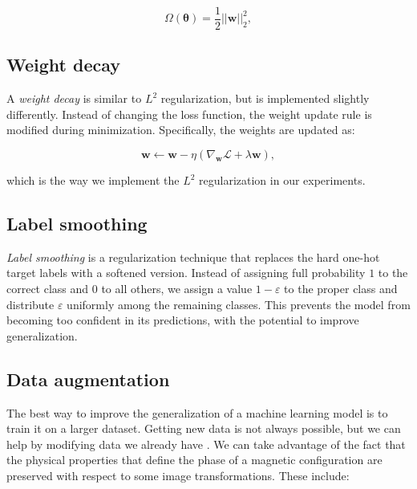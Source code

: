 \begin{equation}
 	\label{eq:l2-regularization}
 	\Omega(\bm{\theta}) = \dfrac{1}{2} ||\bm{w}||_2^2,
\end{equation} 


\subsection{Weight decay}
A \emph{weight decay} is similar to $L^2$ regularization, but is implemented slightly differently. Instead of changing the loss function, the weight update rule is modified during minimization. Specifically, the weights are updated as:

\begin{equation}
\bm{w} \leftarrow \bm{w} - \eta \left( \nabla_{\bm{w}} \mathcal{L} + \lambda \bm{w} \right),
\end{equation}

which is the way we implement the $L^2$ regularization in our experiments.

\subsection{Label smoothing}

\emph{Label smoothing} \cite{muller2019does} is a regularization technique that replaces the hard one-hot target labels with a softened version. Instead of assigning full probability $1$ to the correct class and $0$ to all others, we assign a value $1-\varepsilon$ to the proper class and distribute $\varepsilon$ uniformly among the remaining classes. This prevents the model from becoming too confident in its predictions, with the potential to improve generalization.

\subsection{Data augmentation}

The best way to improve the generalization of a machine learning model is to train it on a larger dataset. Getting new data is not always possible, but we can help by modifying data we already have \cite{bengio2017deep}. We can take advantage of the fact that the physical properties that define the phase of a magnetic configuration are preserved with respect to some image transformations. These include:


